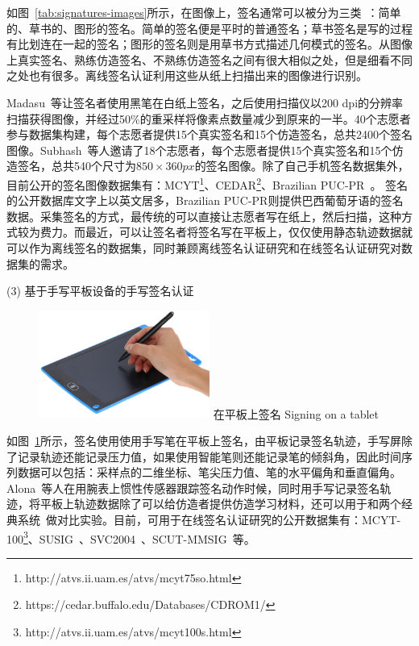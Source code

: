 \begin{table}[!hpb]
\begin{tabular}{|c|m{}|m{}|m{}|}
        \bottomrule
  \end{tabular}
\end{table}

如图~\ref{tab:signatures-images}所示，在图像上，签名通常可以被分为三类~\cite{Hanmandlu2005Off}：简单的、草书的、图形的签名。简单的签名便是平时的普通签名；草书签名是写的过程有比划连在一起的签名；图形的签名则是用草书方式描述几何模式的签名。从图像上真实签名、熟练仿造签名、不熟练仿造签名之间有很大相似之处，但是细看不同之处也有很多。离线签名认证利用这些从纸上扫描出来的图像进行识别。

Madasu~\cite{Hanmandlu2005Off}等让签名者使用黑笔在白纸上签名，之后使用扫描仪以200 dpi的分辨率扫描获得图像，并经过50\%的重采样将像素点数量减少到原来的一半。40个志愿者参与数据集构建，每个志愿者提供15个真实签名和15个仿造签名，总共2400个签名图像。Subhash~\cite{chandra2016offline}等人邀请了18个志愿者，每个志愿者提供15个真实签名和15个仿造签名，总共540个尺寸为$850\times360px$的签名图像。除了自己手机签名数据集外，目前公开的签名图像数据集有：MCYT\footnote{http://atvs.ii.uam.es/atvs/mcyt75so.html}、CEDAR\footnote{https://cedar.buffalo.edu/Databases/CDROM1/}、Brazilian PUC-PR~\cite{freitas2008brazilian}。 签名的公开数据库文字上以英文居多，Brazilian PUC-PR则提供巴西葡萄牙语的签名数据。采集签名的方式，最传统的可以直接让志愿者写在纸上，然后扫描，这种方式较为费力。而最近，可以让签名者将签名写在平板上，仅仅使用静态轨迹数据就可以作为离线签名的数据集，同时兼顾离线签名认证研究和在线签名认证研究对数据集的需求。

(3) 基于手写平板设备的手写签名认证

\begin{figure}[!htp]
  \centering
  \includegraphics[width=0.5\textwidth]{figure/tablet.png}
  \bicaption
    {在平板上签名}
    {Signing on a tablet}
  \label{fig:signing-tablet}
\end{figure}
如图~\ref{fig:signing-tablet}所示，签名使用使用手写笔在平板上签名，由平板记录签名轨迹，手写屏除了记录轨迹还能记录压力值，如果使用智能笔则还能记录笔的倾斜角，因此时间序列数据可以包括：采样点的二维坐标、笔尖压力值、笔的水平偏角和垂直偏角。Alona~\cite{Levy2018Handwritten}等人在用腕表上惯性传感器跟踪签名动作时候，同时用手写记录签名轨迹，将平板上轨迹数据除了可以给仿造者提供仿造学习材料，还可以用于和两个经典系统~\cite{fischer2015robust,kholmatov2005identity}做对比实验。目前，可用于在线签名认证研究的公开数据集有：MCYT-100\footnote{http://atvs.ii.uam.es/atvs/mcyt100s.html}、SUSIG~\cite{kholmatov2006sigsa}、SVC2004~\cite{10.1007/978-3-540-25948-0_3}、SCUT-MMSIG~\cite{10.1007/978-3-319-69923-3_78}等。

